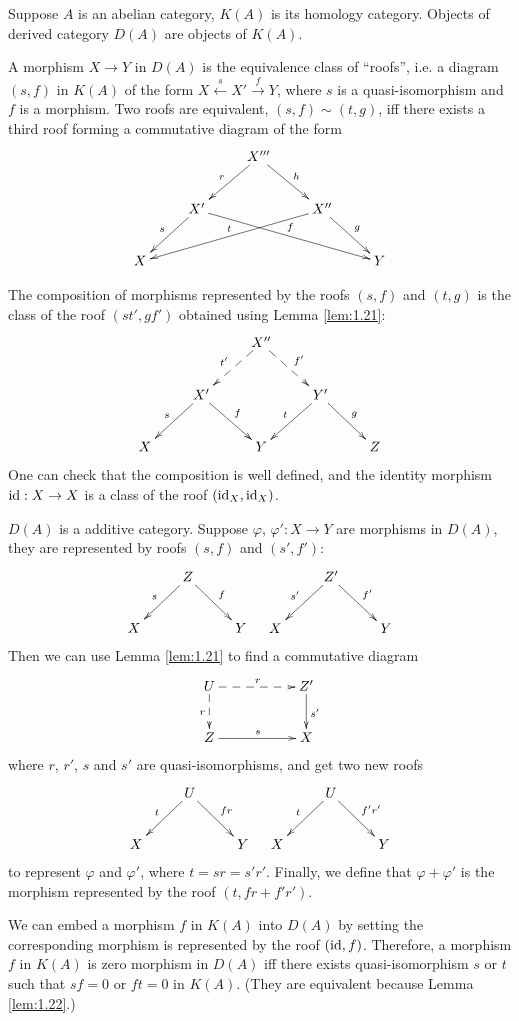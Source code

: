 \begin{para}
	Suppose $A$ is an abelian category, $K(A)$ is its homology category. Objects of derived category $D(A)$ are objects of $K(A)$. 
	\begin{compactenum}[\quad (1)]
		\item A morphism $X\to Y$ in $D(A)$ is the equivalence class of ``roofs'', i.e. a diagram $(s,f)$ in $K(A)$ of the form $X\xleftarrow{s}X'\xrightarrow{f}Y$, where $s$ is a quasi-isomorphism and $f$ is a morphism.
		Two roofs are equivalent, $(s,f)\sim (t,g)$, iff there exists a third roof forming a commutative diagram of the form
		\[
			\xymatrix{
				&  & X''' \ar@{->}[rd]^{h} \ar@{->}[ld]_{r} &  &  \\
				& X' \ar@{->}[ld]_{s} \ar@{->}[rrrd]^{f} &  & X'' \ar@{->}[rd]^{g} \ar@{->}[llld]_{t} &  \\
				X &  &  &  & Y
			}
		\]
		\item The composition of morphisms represented by the roofs $(s,f)$ and $(t,g)$ is the class of the roof $(st',gf')$ obtained using Lemma \ref{lem:1.21}:
		\[
			\xymatrix{
			 &  & X'' \ar@{-->}[ld]_{t'} \ar@{-->}[rd]^{f'} &  &  \\
			 & X' \ar@{->}[ld]_{s} \ar@{->}[rd]^{f} &  & Y' \ar@{->}[ld]_{t} \ar@{->}[rd]^{g} &  \\
			X &  & Y &  & Z
			}
		\]
		One can check that the composition is well defined, and the identity morphism $\operatorname{id}:X\to X$ is a class of the roof $(\operatorname{id}_X,\operatorname{id}_X)$.
		\item $D(A)$ is a additive category. Suppose $\varphi$, $\varphi':X\to Y$ are morphisms in $D(A)$, they are represented by roofs $(s,f)$ and $(s',f')$: 
		\[
			\xymatrix{
				& Z \ar@{->}[ld]_{s} \ar@{->}[rd]^{f} &  \\
				X &  & Y
				}
			\quad
			\xymatrix{
				& Z' \ar@{->}[ld]_{s'} \ar@{->}[rd]^{f'} &  \\
				X &  & Y
			}
		\]
		Then we can use Lemma \ref{lem:1.21} to find a commutative diagram
		\[
			\xymatrix{
				U \ar@{-->}[rr]^{r} \ar@{-->}[d]_{r} &  & Z' \ar@{->}[d]^{s'} \\
				Z \ar@{->}[rr]^{s} &  & X
				}
		\]
		where $r$, $r'$, $s$ and $s'$ are quasi-isomorphisms, and get two new roofs 
		\[
			\xymatrix{
				& U \ar@{->}[ld]_{t} \ar@{->}[rd]^{fr} &  \\
				X &  & Y
				}
			\quad 
			\xymatrix{
				& U \ar@{->}[ld]_{t} \ar@{->}[rd]^{f'r'} &  \\
				X &  & Y
				}
		\]
		to represent $\varphi$ and $\varphi'$, where $t=sr=s'r'$. Finally, we define that $\varphi+\varphi'$ is the morphism represented by the roof $(t,fr+f'r')$. 
	\item We can embed a morphism $f$ in $K(A)$ into $D(A)$ by setting the corresponding morphism is represented by the roof $(\operatorname{id},f)$. Therefore, a morphism $f$ in $K(A)$ is zero morphism in $D(A)$ iff there exists quasi-isomorphism $s$ or $t$ such that $sf=0$ or $ft=0$ in $K(A)$. (They are equivalent because Lemma \ref{lem:1.22}.)
	\end{compactenum}
\end{para}

